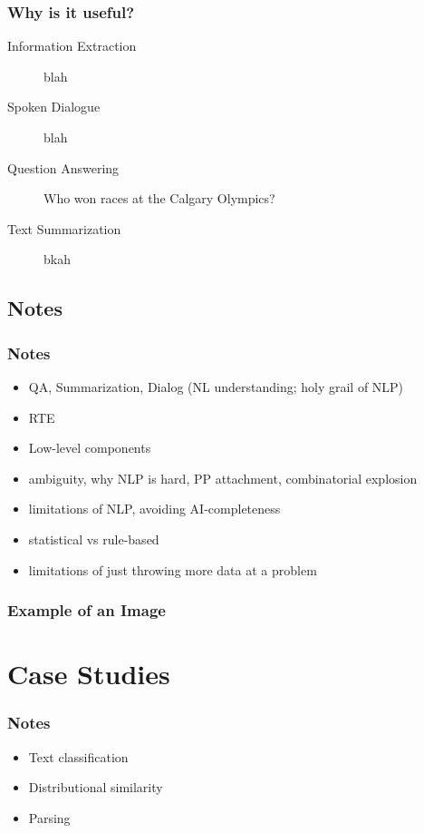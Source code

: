 \documentclass{beamer}             %
\begin{document}
\begin{frame}
  \frametitle{Why is it useful?}

  \begin{description}
    \item [Information Extraction] blah
    \item [Spoken Dialogue] blah
    \item [Question Answering] Who won races at the Calgary Olympics?
    \item [Text Summarization] bkah
  \end{description}



\end{frame}

\subsection{Notes}

\begin{frame}
  \frametitle{Notes}
  \begin{itemize}
    \item QA, Summarization, Dialog (NL understanding; holy grail of NLP)
    \item RTE
    \item Low-level components
    \item ambiguity, why NLP is hard, PP attachment, combinatorial explosion
    \item limitations of NLP, avoiding AI-completeness
    \item statistical vs rule-based
    \item limitations of just throwing more data at a problem
  \end{itemize}
\end{frame}

\begin{frame}
  \frametitle{Example of an Image}
\end{frame}


\section{Case Studies}

\begin{frame}
  \frametitle{Notes}
  \begin{itemize}
    \item Text classification
    \item Distributional similarity
    \item Parsing
  \end{itemize}
\end{frame}
\end{document}
